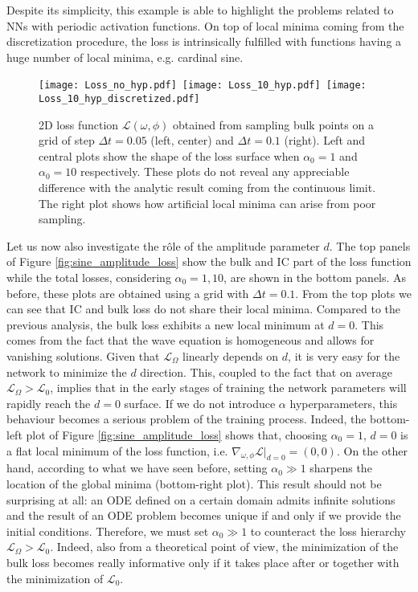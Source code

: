 \documentclass{article}
\newcommand{\mc}{\mathcal}
\begin{document}
Despite its simplicity, this example is able to highlight the problems related to NNs with periodic activation functions. On top of local minima coming from the discretization procedure, the loss is intrinsically fulfilled with functions having a huge number of local minima, e.g. cardinal sine.
\begin{figure}[t!]
\begin{center}
  \texttt{[image: Loss\_no\_hyp.pdf]}\, \texttt{[image: Loss\_10\_hyp.pdf]}\, \texttt{[image: Loss\_10\_hyp\_discretized.pdf]}
  \caption{2D loss function $\mc{L}(\omega,\phi)$ obtained from sampling bulk points on a grid of step $\Delta t=0.05$ (left, center) and $\Delta t=0.1$ (right). Left and central plots show the shape of the loss surface when $\alpha_0=1$ and $\alpha_0=10$ respectively. These plots do not reveal any appreciable difference with the analytic result coming from the continuous limit. The right plot shows how artificial local minima can arise from poor sampling.}
  \label{fig:sineloss}
  \end{center}
\end{figure}

Let us now also investigate the r\^ole of the amplitude parameter $d$. The top panels of Figure \ref{fig:sine_amplitude_loss} show the bulk and IC part of the loss function while the total losses, considering $\alpha_0=1,10$, are shown in the bottom panels. As before, these plots are obtained using a grid with $\Delta t=0.1$. From the top plots we can see that IC and bulk loss do not share their local minima. Compared to the previous analysis, the bulk loss exhibits a new local minimum at $d=0$. This comes from the fact that the wave equation is homogeneous and allows for vanishing solutions. Given that $\mc{L}_{\Omega}$ linearly depends on $d$, it is very easy for the network to minimize the $d$ direction. This, coupled to the fact that on average $\mc{L}_{\Omega}>\mc{L}_{0}$, implies that in the early stages of training the network parameters will rapidly reach the $d=0$ surface. If we do not introduce $\alpha$ hyperparameters, this behaviour becomes a serious problem of the training process. Indeed, the bottom-left plot of Figure \ref{fig:sine_amplitude_loss} shows that, choosing $\alpha_0=1$, $d=0$ is a flat local minimum of the loss function, i.e. $\nabla_{\omega,\phi}\mc{L}|_{d=0}=(0,0)$.
On the other hand, according to what we have seen before, setting $\alpha_0\gg 1$ sharpens the location of the global minima (bottom-right plot). This result should not be surprising at all: an ODE defined on a certain domain admits infinite solutions and the result of an ODE problem becomes unique if and only if we provide the initial conditions. Therefore, we must set $\alpha_0\gg 1$ to counteract the loss hierarchy $\mc{L}_{\Omega}>\mc{L}_{0}$.
Indeed, also from a theoretical point of view, the minimization of the bulk loss becomes really informative only if it takes place after or together with the minimization of $\mc{L}_0$.  
\end{document}
